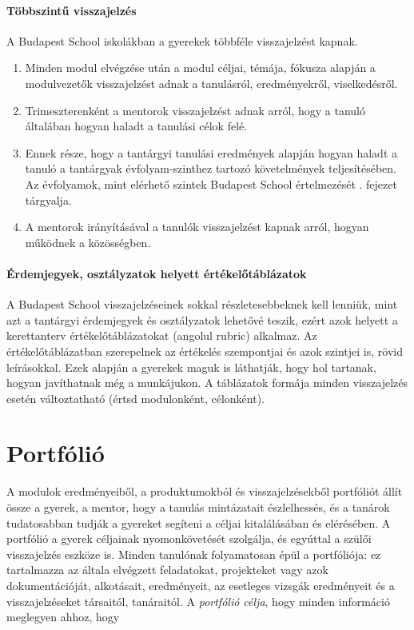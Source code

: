 \paragraph{Többszintű visszajelzés} A Budapest School iskolákban a gyerekek
többféle visszajelzést kapnak. \begin{enumerate}
      \item Minden modul elvégzése után a modul céljai, témája, fókusza alapján
            a
            modulvezetők visszajelzést adnak a tanulásról, eredményekről,
            viselkedésről.
      \item Trimeszterenként a mentorok visszajelzést adnak arról, hogy a
            tanuló
            általában hogyan haladt a tanulási célok felé.
      \item Ennek része, hogy a tantárgyi tanulási eredmények alapján hogyan haladt a
            tanuló a tantárgyak évfolyam-szinthez tartozó követelmények
            teljesítésében. Az
            évfolyamok, mint elérhető szintek Budapest School értelmezését
            . fejezet tárgyalja.
      \item A mentorok irányításával a tanulók visszajelzést kapnak arról,
            hogyan
            működnek a közösségben.
\end{enumerate}

\paragraph{Érdemjegyek, osztályzatok helyett értékelőtáblázatok} A Budapest
School visszajelzéseinek sokkal részletesebbeknek kell lenniük, mint azt a
tantárgyi érdemjegyek és osztályzatok lehetővé teszik, ezért azok helyett a
kerettanterv
értékelőtáblázatokat (angolul rubric) alkalmaz. Az értékelőtáblázatban
szerepelnek az értékelés szempontjai és azok szintjei is, rövid leírásokkal.
Ezek alapján a gyerekek maguk is láthatják, hogy hol tartanak, hogyan
javíthatnak még a munkájukon. A táblázatok formája minden visszajelzés esetén
változtatható (értsd modulonként, célonként).

\section{Portfólió}
\label{sec:portfolio}
A modulok eredményeiből, a produktumokból és visszajelzésekből portfóliót
állít össze a gyerek, a mentor, hogy a tanulás mintázatait észlelhessés, és a
tanárok tudatosabban tudják
a gyereket segíteni a céljai kitalálásában és elérésében. A portfólió a gyerek
céljainak nyomonkövetését szolgálja, és egyúttal a szülői visszajelzés eszköze
is. Minden tanulónak folyamatosan épül a portfóliója: ez tartalmazza az általa
elvégzett feladatokat, projekteket vagy azok dokumentációját, alkotásait,
eredményeit, az esetleges vizsgák eredményeit és a visszajelzéseket társaitól,
tanáraitól. A \emph{portfólió célja}, hogy minden információ meglegyen ahhoz,
hogy


